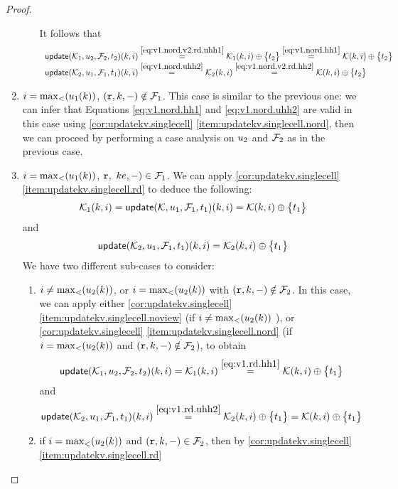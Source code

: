 \begin{proof}
\begin{enumerate}
\begin{enumerate}
It follows that 
\[
\begin{array}{l}
\updateKV(\hh_1, \vi_2, \opset_2, \txid_2)(\ke, i) \stackrel{\cref{eq:v1.nord.v2.rd.uhh1}}{=} \hh_1(\ke, i) \oplus \Set{\txid_2} \stackrel{\cref{eq:v1.nord.hh1}}{=} \hh(\ke, i) \oplus \Set{\txid_2}\\
\updateKV(\hh_2,\vi_1,\opset_1, \txid_1)(\ke, i) \stackrel{\cref{eq:v1.nord.uhh2}}{=} \hh_2(\ke, i) \stackrel{\cref{eq:v1.nord.v2.rd.hh2}}{=} \hh(\ke, i) \oplus \Set{\txid_2}
\end{array}
\]
\end{enumerate}
\item $i = \max_{<}(u_1(k))$, $(\textnormal{\texttt r}, k, -) \notin \mathcal{F}_1$. This case is similar to the previous one: we can infer 
that Equations \cref{eq:v1.nord.hh1} and \cref{eq:v1.nord.uhh2} are valid in this case using \cref{cor:updatekv.singlecell}
\cref{item:updatekv.singlecell.nord}, then we can proceed by performing a case analysis on $u_2$ and $\mathcal{F}_2$ as in the previous case.
\item $i = \max_{<}(u_1(k))$, $\textnormal{\texttt r},\ ke, -) \in \mathcal{F}_1$. We can apply \cref{cor:updatekv.singlecell}\cref{item:updatekv.singlecell.rd} 
to deduce the following: 
\begin{equation}
\hh_1(\ke, i) = \updateKV(\hh, \vi_1, \opset_1, \txid_1)(\ke, i) = \hh(\ke, i) \oplus \Set{\txid_1}
\label{eq:v1.rd.hh1}
\end{equation}
and
\begin{equation}
\updateKV(\hh_2, \vi_1, \opset_1, \txid_1)(\ke, i) = \hh_2(\ke, i) \oplus \Set{\txid_1}
\label{eq:v1.rd.uhh2}
\end{equation}
We have two different sub-cases to consider: 
\begin{enumerate}
\item $i \neq \max_{<}(u_2(k))$, or $i = \max_{<}(u_2(k))$ with $(\textnormal{\texttt r},k,-) \notin \mathcal{F}_2$. In this case, we can apply either 
\cref{cor:updatekv.singlecell}\cref{item:updatekv.singlecell.noview} (if $i \neq \max_{<}(u_2(k))$ ), or 
\cref{cor:updatekv.singlecell} \cref{item:updatekv.singlecell.nord} (if $i = \max_{<}(u_2(k))$ and $(\textnormal{\texttt r}, k, -) \notin \mathcal{F}_2$), 
to obtain 
\[
\updateKV(\hh_1, \vi_2, \opset_2, \txid_2)(\ke, i) = \hh_1(\ke, i) \stackrel{\cref{eq:v1.rd.hh1}}{=} \hh(\ke, i) \oplus \Set{\txid_1}
\]
and
\[
\updateKV(\hh_2, \vi_1, \opset_1, \txid_1)(\ke, i) \stackrel{\cref{eq:v1.rd.uhh2}}{=} \hh_2(\ke, i) \oplus \Set{ \txid_1 } = 
\hh(\ke, i) \oplus \Set{ \txid_1 }
\]
\item if $i = \max_{<}(u_2(k))$ and $(\textnormal{\texttt r}, k, -) \in \mathcal{F}_2$, then by \cref{cor:updatekv.singlecell}\cref{item:updatekv.singlecell.rd} 

\end{enumerate}
\end{enumerate}
\end{proof}
